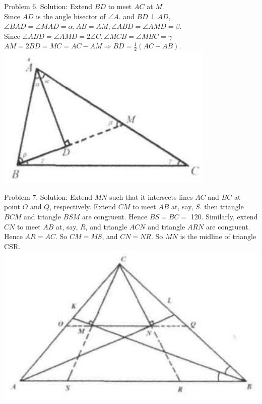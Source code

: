 \documentclass[10pt]{article}
\begin{document}
Problem 6. Solution:
Extend \(B D\) to meet \(A C\) at \(M\).\\
Since \(A D\) is the angle bisector of \(\angle A\). and \(B D \perp A D\), \(\angle B A D=\angle M A D=\alpha, A B=A M, \angle A B D=\angle A M D=\beta\).\\
Since \(\angle A B D=\angle A M D=2 \angle C, \angle M C B=\angle M B C=\gamma\) \(A M=2 B D=M C=A C-A M \Rightarrow B D=\frac{1}{2}(A C-A B)\).\\
\includegraphics[max width=\textwidth, center]{2025_04_17_97bc1f7e44d93c271a88g-069(1)}

Problem 7. Solution:
Extend \(M N\) such that it intersects lines \(A C\) and \(B C\) at point \(O\) and \(Q\), respectively. Extend \(C M\) to meet \(A B\) at, say, \(S\). then triangle \(B C M\) and triangle \(B S M\) are congruent. Hence \(B S=B C=\) 120. Similarly, extend \(C N\) to meet \(A B\) at, say, \(R\), and triangle \(A C N\) and triangle \(A R N\) are congruent. Hence \(A R=A C\). So \(C M=M S\), and \(C N=N R\). So \(M N\) is the midline of triangle CSR.\\
\includegraphics[max width=\textwidth, center]{2025_04_17_97bc1f7e44d93c271a88g-069(2)}
\end{document}
